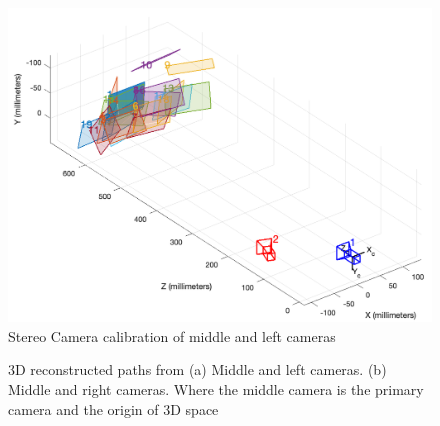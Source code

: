 \documentclass[journal]{IEEEtran}
\begin{document}
\begin{figure}[!t]
	\centering
\includegraphics[width=0.75\linewidth]{Report/figures/StereoML.png}
\caption{Stereo Camera calibration of middle and left cameras}
\label{stereo}
\end{figure}
\begin{figure}[!t]
	\centering
{}
\hfill
{} 
\caption{3D reconstructed paths from (a) Middle and left cameras. (b) Middle and right cameras. Where the middle camera is the primary camera and the origin of 3D space}
\label{3Paths}
\end{figure}
\end{document}
